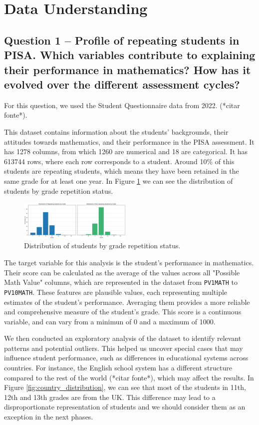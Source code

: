 \section{Data Understanding}\label{sec:data_understanding}

\subsection{Question 1 – Profile of repeating students in PISA. Which variables contribute to explaining their performance in mathematics? How has it evolved over the different assessment cycles?}

For this question, we used the Student Questionnaire data from 2022. (*citar fonte*).

This dataset contains information about the students' backgrounds, their attitudes towards mathematics, and their performance in the PISA assessment. It has 1278 columns, from which 1260 are numerical and 18 are categorical.
It has 613744 rows, where each row corresponds to a student. Around 10\% of this students are repeating students, which means they have been retained in the same grade for at least one year.
In Figure \ref{fig:grade_distribution} we can see the distribution of students by grade repetition status.

\begin{figure}
    \centering
    \includegraphics[width=0.48\textwidth]{figures/Q1_GradeDistribution.png}
    \caption{Distribution of students by grade repetition status.}
    \label{fig:grade_distribution}
\end{figure}

The target variable for this analysis is the student's performance in mathematics. Their score can be calculated as the average of the values across all "Possible Math Value" columns, which are represented in the dataset from \texttt{PV1MATH} to \texttt{PV10MATH}. These features are plausible values, each representing multiple estimates of the student's performance. Averaging them provides a more reliable and comprehensive measure of the student's grade.
This score is a continuous variable, and can vary from a minimun of 0 and a maximum of 1000.

We then conducted an exploratory analysis of the dataset to identify relevant patterns and potential outliers. This helped us uncover special cases that may influence student performance, such as differences in educational systems across countries.
For instance, the English school system has a different structure compared to the rest of the world (*citar fonte*), which may affect the results.
In Figure \ref{fig:country_distribution}, we can see that most of the students in 11th, 12th and 13th grades are from the UK. This difference may lead to a disproportionate representation of students and we should consider them as an exception in the next phases.


